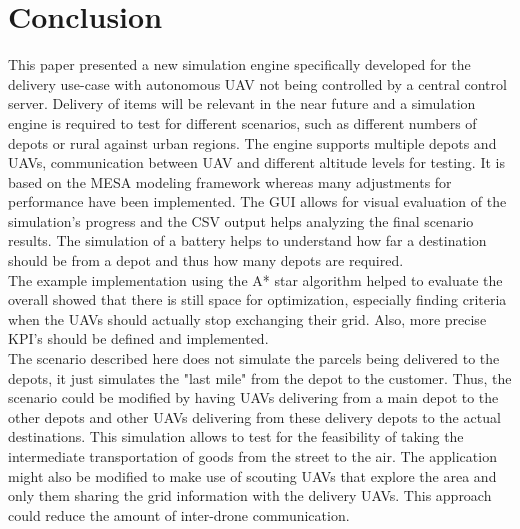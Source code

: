 \section{Conclusion}\label{sec:conclusion}
This paper presented a new simulation engine specifically developed for the delivery use-case with autonomous UAV not being controlled by a central control server. Delivery of items will be relevant in the near future and a simulation engine is required to test for different scenarios, such as different numbers of depots or rural against urban regions. The engine supports multiple depots and UAVs, communication between UAV and different altitude levels for testing. It is based on the MESA modeling framework whereas many adjustments for performance have been implemented. The GUI allows for visual evaluation of the simulation's progress and the CSV output helps analyzing the final scenario results. The simulation of a battery helps to understand how far a destination should be from a depot and thus how many depots are required. \\
The example implementation using the A* star algorithm helped to evaluate the overall showed that there is still space for optimization, especially finding criteria when the UAVs should actually stop exchanging their grid. Also, more precise KPI's should be defined and implemented.\\
The scenario described here does not simulate the parcels being delivered to the depots, it just simulates the "last mile" from the depot to the customer. Thus, the scenario could be modified by having UAVs delivering from a main depot to the other depots and other UAVs delivering from these delivery depots to the actual destinations. This simulation allows to test for the feasibility of taking the intermediate transportation of goods from the street to the air. The application might also be modified to make use of scouting UAVs that explore the area and only them sharing the grid information with the delivery UAVs. This approach could reduce the amount of inter-drone communication.
